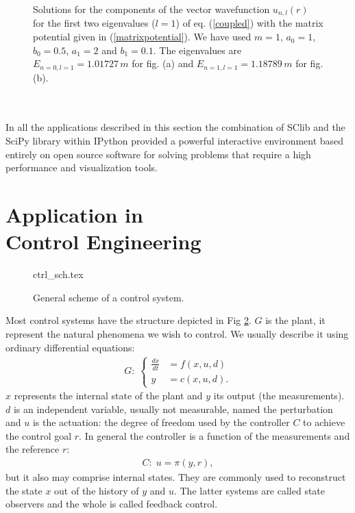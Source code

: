 \documentclass[10pt, a4paper, twocolumn]{article}
\begin{document}
{\begin{figure}[htb]
\begin{minipage}[b]{.9\linewidth}
\end{minipage}
\hfill
\caption{Solutions for the components of the vector wavefunction $u_{n,l}(r)$ for the first two eigenvalues ($l=1$) of eq. (\ref{coupled}) with the matrix potential given in (\ref{matrixpotential}). We have used $m=1$, $a_0=1$, $b_0=0.5$, $a_1=2$ and $b_1=0.1$. The eigenvalues are $E_{n=0,l=1} = 1.01727\,m$ for fig. (a) and  $E_{n=1,l=1} = 1.18789\,m$ for fig. (b).}
\label{wfcoupled}
\end{figure} 
\\
\\
In all the applications described in this section the combination of SClib and the SciPy library within IPython provided a powerful interactive environment based entirely on open source software for solving problems that require a high performance and visualization tools. 
\section{Application in\\Control Engineering}
\begin{figure}[htb]
    \centering
    {\Large {ctrl_sch.tex}}
    \caption{General scheme of a control system.}
    \label{fig:ctrl_sch}
\end{figure}

Most control systems have the structure depicted in Fig \ref{fig:ctrl_sch}.
$G$ is the plant, it represent the natural phenomena we wish to control.
We usually describe it using ordinary differential equations:
\begin{align}
G:\;\left\{
        \begin{array}{rl}
            \frac{dx}{dt} &= f(x,u,d)\\
            y & = c(x,u,d).
        \end{array}
        \right.
        \label{eq:dxdt}
\end{align}
$x$ represents the internal state of the plant and $y$ its output (the
measurements). $d$ is an independent variable, usually not measurable, named the
perturbation and $u$ is the actuation: the degree of freedom used by the
controller $C$ to achieve the control goal $r$. In general the controller is a
function of the measurements and the reference $r$:
\begin{align*}
    C:\;u = \pi(y,r),
\end{align*}
but it also may comprise internal states. They are commonly used to reconstruct
the state $x$ out of the history of $y$ and $u$. The latter systems are called
state observers and the whole is called feedback control.

}
\end{document}
